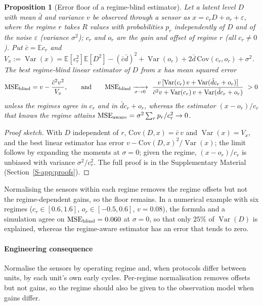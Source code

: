 \documentclass[preprint,12pt]{elsarticle}
\newtheorem{proposition}{Proposition}
\theoremstyle{definition}
\newcommand{\E}{\mathbb{E}}
\DeclareMathOperator{\Var}{Var}
\begin{document}
\begin{proposition}[Error floor of a regime-blind estimator]
\label{prop:regime}
Let a latent level $D$ with mean $\bar d$ and variance $v$ be observed through a sensor as $x=c_rD+o_r+\varepsilon$, where the regime $r$ takes $R$ values with probabilities $p_r$ independently of $D$ and of the noise $\varepsilon$ (variance $\sigma^2$); $c_r$ and $o_r$ are the gain and offset of regime $r$ (all $c_r\ne0$). Put $\bar c=\E c_r$ and $V_x:=\Var(x)=\E[c_r^2]\E[D^2]-(\bar c\bar d)^2+\Var(o_r)+2\bar d\,\mathrm{Cov}(c_r,o_r)+\sigma^2$. The best regime-blind linear estimator of $D$ from $x$ has mean squared error
\begin{equation}
\mathrm{MSE}_{\rm blind}=v-\frac{\bar c^2v^2}{V_x},\qquad\text{and}\qquad \mathrm{MSE}_{\rm blind}\xrightarrow[\sigma\to0]{}\ \frac{v\,[\Var(c_r)\,v+\Var(\bar d c_r+o_r)]}{\bar c^2v+\Var(c_r)\,v+\Var(\bar d c_r+o_r)}\ >0
\end{equation}
unless the regimes agree in $c_r$ and in $\bar d c_r+o_r$, whereas the estimator $(x-o_r)/c_r$ that knows the regime attains $\mathrm{MSE}_{\rm aware}=\sigma^2\sum_rp_r/c_r^2\to0$.
\end{proposition}
\begin{proof}[Proof sketch]
With $D$ independent of $r$, $\mathrm{Cov}(D,x)=\bar c\,v$ and $\Var(x)=V_x$, and the best linear estimator has error $v-\mathrm{Cov}(D,x)^2/\Var(x)$; the limit follows by expanding the moments at $\sigma=0$; given the regime, $(x-o_r)/c_r$ is unbiased with variance $\sigma^2/c_r^2$. The full proof is in the Supplementary Material (Section~\ref{S-app:proofs}).
\end{proof}
Normalising the sensors within each regime removes the regime offsets but not the regime-dependent gains, so the floor remains. In a numerical example with six regimes ($c_r\in[0.6,1.6]$, $o_r\in[-0.5,0.6]$, $v=0.08$), the formula and a simulation agree on $\mathrm{MSE}_{\rm blind}=0.060$ at $\sigma=0$, so that only $25\%$ of $\Var(D)$ is explained, whereas the regime-aware estimator has an error that tends to zero.
\paragraph{Engineering consequence} Normalise the sensors by operating regime and, when protocols differ between units, by each unit's own early cycles. Per-regime normalisation removes offsets but not gains, so the regime should also be given to the observation model when gains differ.
\end{document}
